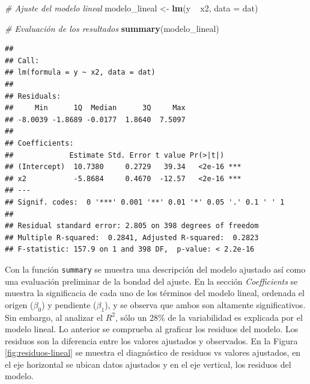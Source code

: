 \documentclass[
  12pt]{article}
\newenvironment{Shaded}{}{}
\newcommand{\CommentTok}[1]{\textcolor[rgb]{0.38,0.63,0.69}{\textit{#1}}}
\newcommand{\DataTypeTok}[1]{\textcolor[rgb]{0.56,0.13,0.00}{#1}}
\newcommand{\KeywordTok}[1]{\textcolor[rgb]{0.00,0.44,0.13}{\textbf{#1}}}
\newcommand{\NormalTok}[1]{#1}
\newcommand{\OperatorTok}[1]{\textcolor[rgb]{0.40,0.40,0.40}{#1}}
\newcommand{\StringTok}[1]{\textcolor[rgb]{0.25,0.44,0.63}{#1}}
\begin{document}
\begin{Shaded}
\begin{Highlighting}[]
\CommentTok{# Ajuste del modelo lineal}
\NormalTok{modelo_lineal <-}\StringTok{ }\KeywordTok{lm}\NormalTok{(y }\OperatorTok{~}\StringTok{ }\NormalTok{x2, }\DataTypeTok{data =}\NormalTok{ dat)}

\CommentTok{# Evaluación de los resultados}
\KeywordTok{summary}\NormalTok{(modelo_lineal)}
\end{Highlighting}
\end{Shaded}

\begin{verbatim}
## 
## Call:
## lm(formula = y ~ x2, data = dat)
## 
## Residuals:
##     Min      1Q  Median      3Q     Max 
## -8.0039 -1.8689 -0.0177  1.8640  7.5097 
## 
## Coefficients:
##             Estimate Std. Error t value Pr(>|t|)    
## (Intercept)  10.7380     0.2729   39.34   <2e-16 ***
## x2           -5.8684     0.4670  -12.57   <2e-16 ***
## ---
## Signif. codes:  0 '***' 0.001 '**' 0.01 '*' 0.05 '.' 0.1 ' ' 1
## 
## Residual standard error: 2.805 on 398 degrees of freedom
## Multiple R-squared:  0.2841, Adjusted R-squared:  0.2823 
## F-statistic: 157.9 on 1 and 398 DF,  p-value: < 2.2e-16
\end{verbatim}

Con la función \texttt{summary} se muestra una descripción del modelo ajustado así como una evaluación preliminar de la bondad del ajuste. En la sección \emph{Coefficients} se muestra la significacia de cada uno de los términos del modelo lineal, ordenada el origen (\(\beta_0\)) y pendiente (\(\beta_1\)), y se observa que ambos son altamente significativos. Sin embargo, al analizar el \(R^2\), sólo un 28\% de la variabilidad es explicada por el modelo lineal.
Lo anterior se comprueba al graficar los residuos del modelo. Los residuos son la diferencia entre los valores ajustados y observados. En la Figura \ref{fig:residuos-lineal} se muestra el diagnóstico de residuos vs valores ajustados, en el eje horizontal se ubican datos ajustados y en el eje vertical, los residuos del modelo.
\end{document}

